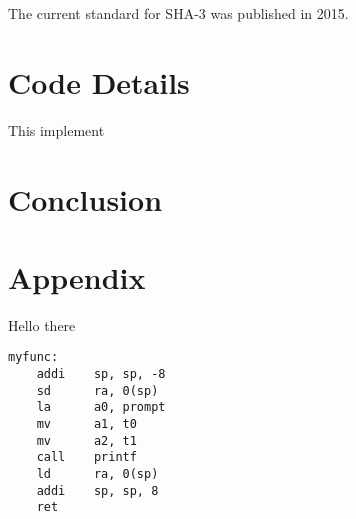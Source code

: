 \documentclass{IEEEtran}
\begin{document}
The current standard for SHA-3 was published in 2015.\cite{dworkin_sha-3_2015}

\section{Code Details}

This implement

\section{Conclusion}

 

\section*{Appendix}

Hello there


\begin{center}
\begin{lstlisting}
myfunc:
    addi    sp, sp, -8
    sd      ra, 0(sp)
    la      a0, prompt
    mv      a1, t0
    mv      a2, t1
    call    printf
    ld      ra, 0(sp)
    addi    sp, sp, 8
    ret
\end{lstlisting}
\end{center}
\end{document}
